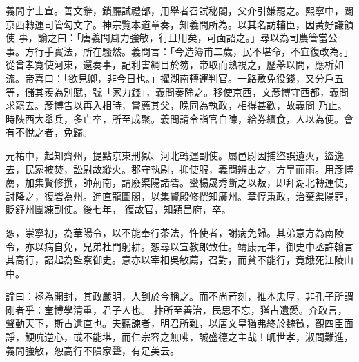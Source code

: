 \begin{pinyinscope}
 義問字士宣。善文辭，鎖廳試禮部，用舉者召試秘閣，父介引嫌罷之。熙寧中，闢京西轉運司管勾文字。神宗覽本道章奏，知義問所為。以其名訪輔臣，因黃好謙領使
 事，諭之曰：「唐義問風力強敏，行且用矣，可面詔之。」尋以為司農管當公事。方行手實法，所在騷然。義問言：「今造簿甫二歲，民不堪命，不宜復改為。」從曾孝寬使河東，還奏事，記利害綱目於笏，帝取而熟視之，歷舉以問，應析如流。帝喜曰：「欲見卿，非今日也。」擢湖南轉運判官。一路敷免役錢，又分戶五等，儲其羨為別賦，號「家力錢」，義問奏除之。移使京西，文彥博守西都，義問求罷去。彥博告以再入相時，嘗薦其父，晚同為執政，相得甚歡，故義問
 乃止。時陜西大舉兵，多亡卒，所至成聚。義問請令詣官自陳，給券續食，人以為便。會有不悅之者，免歸。



 元祐中，起知齊州，提點京東刑獄、河北轉運副使。屬邑尉因捕盜誤遺火，盜逸去，民家被焚，訟尉故縱火。郡守執尉，抑使服，義問辨出之，方旱而雨。用彥博薦，加集賢修撰，帥荊南，請廢渠陽諸砦。蠻楊晟秀斷之以叛，即拜湖北轉運使，討降之，復砦為州。進直龍圖閣，以集賢殿修撰知廣州。章惇秉政，治棄渠陽罪，貶舒州團練副使。後七年，
 復故官，知穎昌府，卒。



 恕，崇寧初，為華陽令，以不能奉行茶法，忤使者，謝病免歸。其弟意方為南陵令，亦以病自免，兄弟杜門躬耕。恕尋以宣教郎致仕。靖康元年，御史中丞許翰言其高行，詔起為監察御史。意亦以宰相吳敏薦，召對，而貧不能行，竟餓死江陵山中。



 論曰：拯為開封，其政嚴明，人到於今稱之。而不尚苛刻，推本忠厚，非孔子所謂剛者乎：奎博學清重，君子人也。
 抃所至善治，民思不忘，猶古遺愛。介敢言，聲動天下，斯古遺直也。夫聽諫者，明君所難，以唐文皇猶弗終於魏徵，觀四臣面諍，鯁吭逆心，或不能堪，而仁宗容之無咈，誠盛德之主哉！屼世孝，淑問難進，義問強敏，恕高行不隕家聲，有足美云。



\end{pinyinscope}